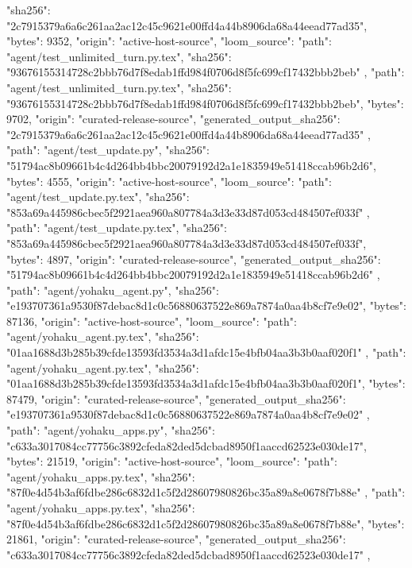 {{      "sha256": "2c7915379a6a6c261aa2ac12c45c9621e00ffd4a44b8906da68a44eead77ad35",
      "bytes": 9352,
      "origin": "active-host-source",
      "loom_source": {
        "path": "agent/test_unlimited_turn.py.tex",
        "sha256": "93676155314728c2bbb76d7f8edab1ffd984f0706d8f5fc699cf17432bbb2beb"
      }
    },
    {
      "path": "agent/test_unlimited_turn.py.tex",
      "sha256": "93676155314728c2bbb76d7f8edab1ffd984f0706d8f5fc699cf17432bbb2beb",
      "bytes": 9702,
      "origin": "curated-release-source",
      "generated_output_sha256": "2c7915379a6a6c261aa2ac12c45c9621e00ffd4a44b8906da68a44eead77ad35"
    },
    {
      "path": "agent/test_update.py",
      "sha256": "51794ac8b09661b4c4d264bb4bbc20079192d2a1e1835949e51418ccab96b2d6",
      "bytes": 4555,
      "origin": "active-host-source",
      "loom_source": {
        "path": "agent/test_update.py.tex",
        "sha256": "853a69a445986cbec5f2921aea960a807784a3d3e33d87d053cd484507ef033f"
      }
    },
    {
      "path": "agent/test_update.py.tex",
      "sha256": "853a69a445986cbec5f2921aea960a807784a3d3e33d87d053cd484507ef033f",
      "bytes": 4897,
      "origin": "curated-release-source",
      "generated_output_sha256": "51794ac8b09661b4c4d264bb4bbc20079192d2a1e1835949e51418ccab96b2d6"
    },
    {
      "path": "agent/yohaku_agent.py",
      "sha256": "e193707361a9530f87debac8d1c0c56880637522e869a7874a0aa4b8cf7e9e02",
      "bytes": 87136,
      "origin": "active-host-source",
      "loom_source": {
        "path": "agent/yohaku_agent.py.tex",
        "sha256": "01aa1688d3b285b39cfde13593fd3534a3d1afdc15e4bfb04aa3b3b0aaf020f1"
      }
    },
    {
      "path": "agent/yohaku_agent.py.tex",
      "sha256": "01aa1688d3b285b39cfde13593fd3534a3d1afdc15e4bfb04aa3b3b0aaf020f1",
      "bytes": 87479,
      "origin": "curated-release-source",
      "generated_output_sha256": "e193707361a9530f87debac8d1c0c56880637522e869a7874a0aa4b8cf7e9e02"
    },
    {
      "path": "agent/yohaku_apps.py",
      "sha256": "c633a3017084cc77756c3892cfeda82ded5dcbad8950f1aaccd62523e030de17",
      "bytes": 21519,
      "origin": "active-host-source",
      "loom_source": {
        "path": "agent/yohaku_apps.py.tex",
        "sha256": "87f0e4d54b3af6fdbe286c6832d1c5f2d28607980826bc35a89a8e0678f7b88e"
      }
    },
    {
      "path": "agent/yohaku_apps.py.tex",
      "sha256": "87f0e4d54b3af6fdbe286c6832d1c5f2d28607980826bc35a89a8e0678f7b88e",
      "bytes": 21861,
      "origin": "curated-release-source",
      "generated_output_sha256": "c633a3017084cc77756c3892cfeda82ded5dcbad8950f1aaccd62523e030de17"
    },
}
